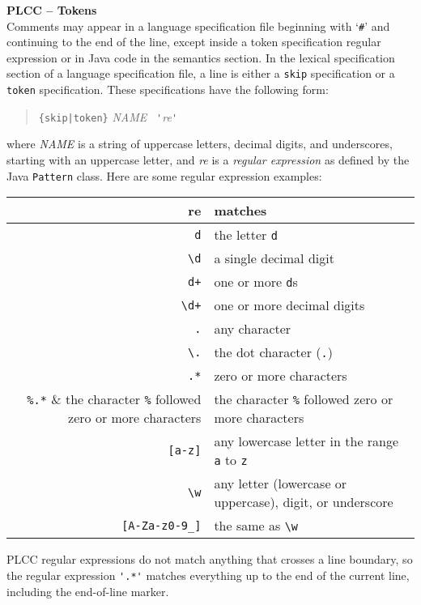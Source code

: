 \begin{minipage}[t]{\sw}
\slidenumber
\LARGE
{\bf PLCC -- Tokens}\\
\Large
Comments may appear in a language specification file
beginning with `\verb'#'' and continuing to the end of the line,
except inside a token specification regular expression
or in Java code in the semantics section.\exx
In the lexical specification section of a language specification file,
a line is either
a \verb'skip' specification or a \verb'token' specification.
These specifications have the following form:
\begin{quote}
\verb'{skip|token}' {\em NAME} \verb. '.{\em re}\verb.'.
\end{quote}
where {\em NAME} is a string of uppercase letters, decimal digits,
and underscores,
starting with an uppercase letter,
and {\em re} is a {\em regular expression}
as defined by the Java \verb'Pattern' class.\exx
Here are some regular expression examples:

\begin{center}
\large
\begin{tabular}{r|l}
{\bf re} & {\bf matches} \\ \hline
\verb'd' & the letter \verb'd' \\
\verb'\d' & a single decimal digit \\
\verb'd+' & one or more \verb'd's \\
\verb'\d+' & one or more decimal digits \\
\verb'.' & any character \\
\verb'\.' & the dot character (\verb'.') \\
\verb'.*' & zero or more characters \\
\verb'%.*' & the character \verb'%' followed zero or more characters \\
\verb'[a-z]' & any lowercase letter in the range \verb'a' to \verb'z' \\
\verb'\w'  & any letter (lowercase or uppercase), digit, or underscore \\
\verb'[A-Za-z0-9_]' & the same as \verb'\w' \\
\end{tabular}
\end{center}

\Large
PLCC regular expressions do not match anything that crosses a line boundary,
so the regular expression \verb?'.*'? matches everything
up to the end of the current line, including the end-of-line marker.
\end{minipage}
\clearpage
